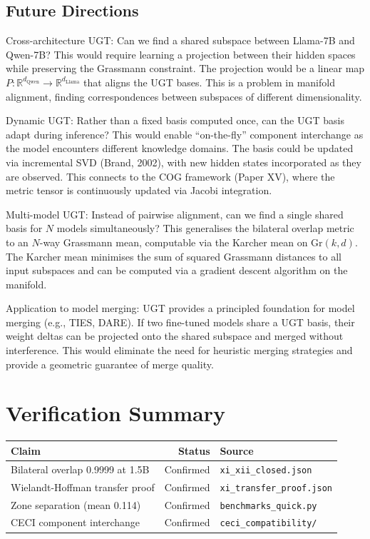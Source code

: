 \documentclass[11pt]{article}
\begin{document}
\subsection{Future Directions}

Cross-architecture UGT: Can we find a shared subspace between Llama-7B and Qwen-7B? This would require learning a projection between their hidden spaces while preserving the Grassmann constraint. The projection would be a linear map $P: \mathbb{R}^{d_{\mathrm{Qwen}}} \rightarrow \mathbb{R}^{d_{\mathrm{Llama}}}$ that aligns the UGT bases. This is a problem in manifold alignment, finding correspondences between subspaces of different dimensionality.

Dynamic UGT: Rather than a fixed basis computed once, can the UGT basis adapt during inference? This would enable ``on-the-fly'' component interchange as the model encounters different knowledge domains. The basis could be updated via incremental SVD (Brand, 2002), with new hidden states incorporated as they are observed. This connects to the COG framework (Paper XV), where the metric tensor is continuously updated via Jacobi integration.

Multi-model UGT: Instead of pairwise alignment, can we find a single shared basis for $N$ models simultaneously? This generalises the bilateral overlap metric to an $N$-way Grassmann mean, computable via the Karcher mean on $\mathrm{Gr}(k,d)$. The Karcher mean minimises the sum of squared Grassmann distances to all input subspaces and can be computed via a gradient descent algorithm on the manifold.

Application to model merging: UGT provides a principled foundation for model merging (e.g., TIES, DARE). If two fine-tuned models share a UGT basis, their weight deltas can be projected onto the shared subspace and merged without interference. This would eliminate the need for heuristic merging strategies and provide a geometric guarantee of merge quality.


\section{Verification Summary}

\begin{table}[h]
\centering
\begin{tabular}{lrl}
\toprule
Claim & Status & Source \\
\midrule
Bilateral overlap 0.9999 at 1.5B & Confirmed & \texttt{xi\_xii\_closed.json} \\
Wielandt-Hoffman transfer proof & Confirmed & \texttt{xi\_transfer\_proof.json} \\
Zone separation (mean 0.114) & Confirmed & \texttt{benchmarks\_quick.py} \\
CECI component interchange & Confirmed & \texttt{ceci\_compatibility/} \\
\bottomrule
\end{tabular}
\end{table}
\end{document}
